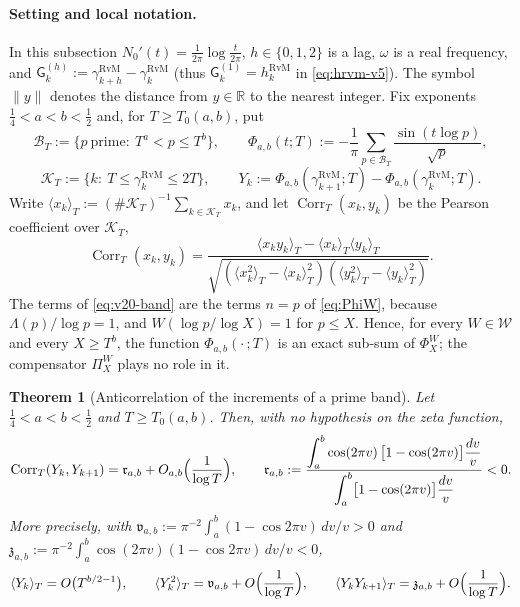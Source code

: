 \documentclass[11pt,a4paper]{article}
\numberwithin{equation}{section}
\newtheorem{theorem}{Theorem}[section]
\theoremstyle{definition}
\theoremstyle{remark}
\begin{document}
\paragraph{Setting and local notation.}
In this subsection $N_0'(t)=\frac1{2\pi}\log\frac t{2\pi}$, $h\in\{0,1,2\}$ is a lag, $\omega$ is a real frequency, and $\mathsf G_k^{(h)}:=\gamma^{\mathrm{RvM}}_{k+h}-\gamma^{\mathrm{RvM}}_k$ (thus $\mathsf G_k^{(1)}=h_k^{\mathrm{RvM}}$ in \eqref{eq:hrvm-v5}). The symbol $\|y\|$ denotes the distance from $y\in\mathbb R$ to the nearest integer. Fix exponents $\tfrac14<a<b<\tfrac12$ and, for $T\ge T_0(a,b)$, put
\begin{equation}\label{eq:v20-band}
 \mathcal B_T:=\{p\ \text{prime}:\ T^a<p\le T^b\},\qquad
 \Phi_{a,b}(t;T):=-\frac1\pi\sum_{p\in\mathcal B_T}\frac{\sin(t\log p)}{\sqrt p},
\end{equation}
\begin{equation}\label{eq:v20-Y}
 \mathcal K_T:=\{k:\ T\le\gamma^{\mathrm{RvM}}_k\le2T\},\qquad
 Y_k:=\Phi_{a,b}(\gamma^{\mathrm{RvM}}_{k+1};T)-\Phi_{a,b}(\gamma^{\mathrm{RvM}}_k;T).
\end{equation}
Write $\langle x_k\rangle_T:=(\#\mathcal K_T)^{-1}\sum_{k\in\mathcal K_T}x_k$, and let $\operatorname{Corr}_T(x_k,y_k)$ be the Pearson coefficient over $\mathcal K_T$,
\begin{equation}
 \operatorname{Corr}_T(x_k,y_k)=\frac{\langle x_ky_k\rangle_T-\langle x_k\rangle_T\langle y_k\rangle_T}
 {\sqrt{(\langle x_k^2\rangle_T-\langle x_k\rangle_T^2)(\langle y_k^2\rangle_T-\langle y_k\rangle_T^2)}}.
\end{equation}
The terms of \eqref{eq:v20-band} are the terms $n=p$ of \eqref{eq:PhiW}, because $\Lambda(p)/\log p=1$, and $W(\log p/\log X)=1$ for $p\le X$. Hence, for every $W\in\mathcal W$ and every $X\ge T^b$, the function $\Phi_{a,b}(\cdot\,;T)$ is an exact sub-sum of $\Phi_X^W$; the compensator $\Pi_X^W$ plays no role in it.

\begin{theorem}[Anticorrelation of the increments of a prime band]\label{thm:v20-anticorr}
Let $\tfrac14<a<b<\tfrac12$ and $T\ge T_0(a,b)$. Then, with no hypothesis on the zeta function,
\begin{equation}\label{eq:v20-main}
 \operatorname{Corr}_T(Y_k,Y_{k+1})=\mathfrak r_{a,b}+O_{a,b}\Bigl(\frac1{\log T}\Bigr),\qquad
 \mathfrak r_{a,b}:=\frac{\displaystyle\int_a^b\cos(2\pi v)\,\bigl[1-\cos(2\pi v)\bigr]\frac{dv}{v}}
 {\displaystyle\int_a^b\bigl[1-\cos(2\pi v)\bigr]\frac{dv}{v}}<0 .
\end{equation}
More precisely, with $\mathfrak v_{a,b}:=\pi^{-2}\int_a^b(1-\cos 2\pi v)\,dv/v>0$ and $\mathfrak z_{a,b}:=\pi^{-2}\int_a^b\cos(2\pi v)(1-\cos 2\pi v)\,dv/v<0$,
\begin{equation}\label{eq:v20-var-cov}
 \langle Y_k\rangle_T=O\bigl(T^{b/2-1}\bigr),\qquad
 \langle Y_k^2\rangle_T=\mathfrak v_{a,b}+O\Bigl(\frac1{\log T}\Bigr),\qquad
 \langle Y_kY_{k+1}\rangle_T=\mathfrak z_{a,b}+O\Bigl(\frac1{\log T}\Bigr).
\end{equation}
\end{theorem}
\end{document}
